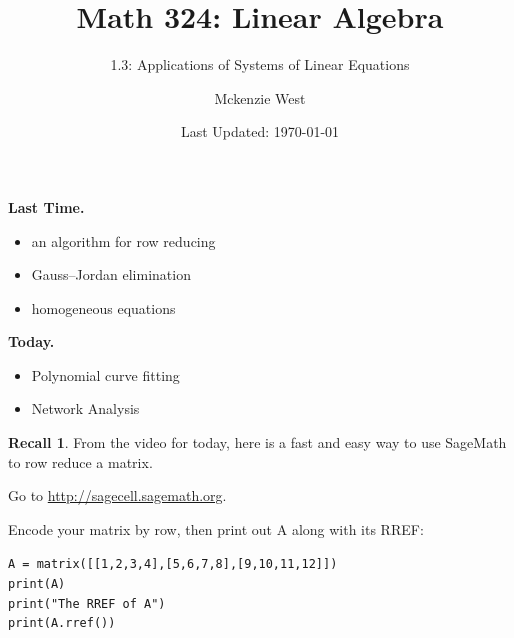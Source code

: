 \documentclass[handout]{beamer}
\theoremstyle{definition}
\newtheorem*{recall}{Recall}
\begin{document}
	\title{Math 324: Linear Algebra}
	\subtitle{1.3: Applications of Systems of Linear Equations}
	\author{Mckenzie West}
	\date{Last Updated: \today}
\begin{frame}
\maketitle
\end{frame}

\begin{frame}{\insertframenumber}
	\begin{block}{\textbf{Last Time.}}
	\begin{itemize}[label=--]
		\item an algorithm for row reducing
		\item Gauss--Jordan elimination
		\item homogeneous equations
	\end{itemize}
	\end{block}
\begin{block}{\textbf{Today.}}
	\begin{itemize}[label=--]
		\item Polynomial curve fitting
		\item Network Analysis
	\end{itemize}
\end{block}
\end{frame}
\begin{frame}{\insertframenumber}
	\begin{recall}
		From the video for today, here is a fast and easy way to use SageMath to row reduce a matrix.
		
		Go to \url{http://sagecell.sagemath.org}.  
	
	Encode your matrix by row, then print out A along with its RREF:
	
	\texttt{A = matrix([[1,2,3,4],[5,6,7,8],[9,10,11,12]])\\
		print(A)\\
		print("The RREF of A")\\
		print(A.rref())\\}
	\end{recall}
\end{frame}
\end{document}
